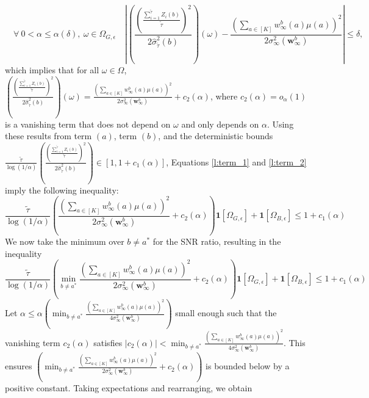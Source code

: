 \documentclass{article}
\begin{document}
\begin{appendices}
\begin{equation}
    \quad \forall  \ 0<\alpha \leq \alpha(\delta), \ \omega \in \Omega_{G, \epsilon} \quad \left|\left(\frac{\left(\frac{\sum_{i=1}^{\tilde\tau}{Z}_i(b)}{\tilde\tau}\right)^2}{2 \hat\sigma_{\tilde\tau}^2(b)}\right)(\omega) - \frac{\left(\sum_{a \in [K]}w_\infty^b(a) \mu(a)\right)^2}{2\sigma_\infty^2(\bm{w}_\infty^b)}\right| \leq \delta,
\end{equation}
which implies that for all $\omega \in \Omega$, $\left(\frac{\left(\frac{\sum_{i=1}^{\tilde\tau}{Z}_i(b)}{\tilde\tau}\right)^2}{2 \hat\sigma_{\tilde\tau}^2(b)}\right)(\omega) = \frac{\left(\sum_{a \in [K]}w_\infty^b(a) \mu(a)\right)^2}{2\sigma_\infty^2(\bm{w}_\infty^b)} + c_2(\alpha)$, where $c_2(\alpha) = o_\alpha(1)$ is a vanishing term that does not depend on $\omega$ and only depends on $\alpha$. Using these results from term $(a)$, term $(b)$, and the deterministic bounds $\frac{\tilde\tau}{\log(1/\alpha)}\left(\frac{\left(\frac{\sum_{i=1}^{\tilde\tau}{Z}_i(b)}{\tilde\tau}\right)^2}{2 \hat\sigma_{\tilde\tau}^2(b)}\right) 
\in [1, 1+c_1(\alpha)]$, Equations \eqref{l:term_1} and \eqref{l:term_2} imply the following inequality: 
\begin{equation}
    \frac{\tilde\tau}{\log(1/\alpha)}\left( \frac{\left(\sum_{a \in [K] }w_\infty^b(a)\mu(a) \right)^2}{2\sigma^2_{\infty}(\bm{w}_\infty^b)} + c_2(\alpha)\right)\mathbf{1}[\Omega_{G, \epsilon}] + \mathbf{1}[\Omega_{B, \epsilon}]\leq 1+c_1(\alpha)
\end{equation}
We now take the minimum over $b \neq a^*$ for the SNR ratio, resulting in the inequality 
\begin{equation}
   \frac{\tilde\tau}{\log(1/\alpha)}\left( \min_{b \neq a^*}\frac{\left(\sum_{a \in [K] }w_\infty^b(a)\mu(a) \right)^2}{2\sigma^2_{\infty}(\bm{w}_\infty^b)} + c_2(\alpha)\right)\mathbf{1}[\Omega_{G, \epsilon}] + \mathbf{1}[\Omega_{B, \epsilon}]\leq 1+c_1(\alpha)
\end{equation}
Let $\alpha \leq \alpha\left(\min_{b \neq a^*}\frac{\left(\sum_{a \in [K] }w_\infty^b(a)\mu(a) \right)^2}{4\sigma^2_{\infty}(\bm{w}_\infty^b)}\right)$ small enough such that the vanishing term $c_2(\alpha)$ satisfies $|c_2(\alpha)| < \min_{b \neq a^*}\frac{\left(\sum_{a \in [K] }w_\infty^b(a)\mu(a) \right)^2}{4\sigma^2_{\infty}(\bm{w}_\infty^b)} $. This ensures $\left( \min_{b \neq a^*}\frac{\left(\sum_{a \in [K] }w_\infty^b(a)\mu(a) \right)^2}{2\sigma^2_{\infty}(\bm{w}_\infty^b)} + c_2(\alpha)\right)$ is bounded below by a positive constant. Taking expectations and rearranging, we obtain 

\end{appendices}
\end{document}
